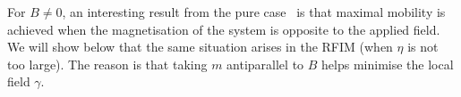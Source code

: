 \documentclass{iopart}
\newcommand{\mdis}[0]{\ensuremath{\mathcal{M}}}
\begin{document}

For $B\neq0$, an interesting result from the pure case~\cite{van2010second, GuiothJack2020} is that maximal mobility is achieved when the magnetisation of the system is opposite to the applied field.  We will show below that the same situation arises in the RFIM (when $\eta$ is not too large).  The reason is that taking $m$ antiparallel to $B$ helps minimise the local field $\gamma$.

\end{document}
